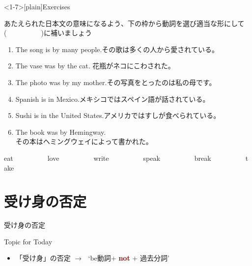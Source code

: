 \documentclass[aspectratio=169,xcolor={dvipsnames,table}]{beamer}
\newcommand{\myaudio}[1]{\href{#1}{\faVolumeUp}}
\begin{document}
\begin{frame}<1-7>[plain]{Exercises}

{\small あたえられた日本文の意味になるよう、下の枠から動詞を選び適当な形にして(~~~~~~~~~~)に補いましょう}\hfill{\scriptsize \myaudio{./audio/051_passive_05.mp3}
}
\begin{enumerate}
 \item The song is  by many people.\hfill{\small その歌は多くの人から愛されている。}
 \item The vase was  by the cat. \hfill{\small 花瓶がネコにこわされた。}
 \item The photo was  by my mother.\hfill{\small その写真をとったのは私の母です。}
 \item Spanish is  in Mexico.\hfill{\small メキシコではスペイン語が話されている。}
 \item Sushi is  in the United States.\hfill{\small アメリカではすしが食べられている。}
 \item The book was  by Hemingway. \\
\hfill{\small その本はヘミングウェイによって書かれた。}
\end{enumerate}

\begin{tcolorbox}\centering
 eat~~~~~~~~~~love~~~~~~~~~~write~~~~~~~~~~speak~~~~~~~~~~break~~~~~~~~~~take
\end{tcolorbox}
\end{frame}
\section{受け身の否定}
\begin{frame}[plain]{受け身の否定}
\large

\hfill{}


\vfill

\hfill{\scriptsize \myaudio{./audio/051_passive_06.mp3}}

\begin{exampleblock}{Topic for Today}
\begin{itemize}[square]\small
 \item 「受け身」の否定 $\longrightarrow$\,\,\,\,`be動詞$+$ \textcolor{Maroon}{{\bfseries not}} $+$ 過去分詞'
\end{itemize}
     \end{exampleblock}

\end{frame}
\end{document}
